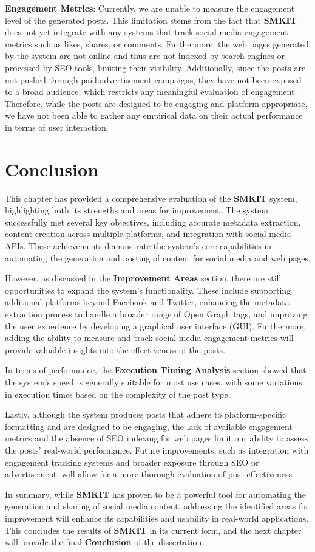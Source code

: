 \textbf{Engagement Metrics}: Currently, we are unable to measure the engagement level of the generated posts. This limitation stems from the fact that \textbf{SMKIT} does not yet integrate with any systems that track social media engagement metrics such as likes, shares, or comments. Furthermore, the web pages generated by the system are not online and thus are not indexed by search engines or processed by SEO tools, limiting their visibility. Additionally, since the posts are not pushed through paid advertisement campaigns, they have not been exposed to a broad audience, which restricts any meaningful evaluation of engagement. Therefore, while the posts are designed to be engaging and platform-appropriate, we have not been able to gather any empirical data on their actual performance in terms of user interaction.


\section{Conclusion}
\label{sec:results_conclusion}
This chapter has provided a comprehensive evaluation of the \textbf{SMKIT} system, highlighting both its strengths and areas for improvement. The system successfully met several key objectives, including accurate metadata extraction, content creation across multiple platforms, and integration with social media APIs. These achievements demonstrate the system’s core capabilities in automating the generation and posting of content for social media and web pages.

However, as discussed in the \textbf{Improvement Areas} section, there are still opportunities to expand the system's functionality. These include supporting additional platforms beyond Facebook and Twitter, enhancing the metadata extraction process to handle a broader range of Open Graph tags, and improving the user experience by developing a graphical user interface (GUI). Furthermore, adding the ability to measure and track social media engagement metrics will provide valuable insights into the effectiveness of the posts.

In terms of performance, the \textbf{Execution Timing Analysis} section showed that the system’s speed is generally suitable for most use cases, with some variations in execution times based on the complexity of the post type.

Lastly, although the system produces posts that adhere to platform-specific formatting and are designed to be engaging, the lack of available engagement metrics and the absence of SEO indexing for web pages limit our ability to assess the posts' real-world performance. Future improvements, such as integration with engagement tracking systems and broader exposure through SEO or advertisement, will allow for a more thorough evaluation of post effectiveness.

In summary, while \textbf{SMKIT} has proven to be a powerful tool for automating the generation and sharing of social media content, addressing the identified areas for improvement will enhance its capabilities and usability in real-world applications. This concludes the results of \textbf{SMKIT} in its current form, and the next chapter will provide the final \textbf{Conclusion} of the dissertation.
